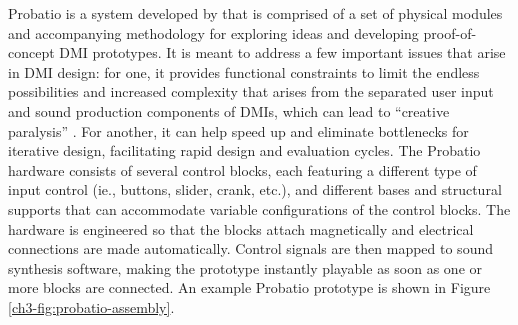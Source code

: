 \documentclass[letterpaper, 12pt]{article}
\begin{document}
Probatio is a system developed by \citet{Calegario2019} that is comprised of a set of physical modules and accompanying methodology for exploring ideas and developing proof-of-concept DMI prototypes. It is meant to address a few important issues that arise in DMI design: for one, it provides functional constraints to limit the endless possibilities and increased complexity that arises from the separated user input and sound production components of DMIs, which can lead to ``creative paralysis'' \citep{Magnusson2010}. For another, it can help speed up and eliminate bottlenecks for iterative design, facilitating rapid design and evaluation cycles. The Probatio hardware consists of several control blocks, each featuring a different type of input control (ie., buttons, slider, crank, etc.), and different bases and structural supports that can accommodate variable configurations of the control blocks. The hardware is engineered so that the blocks attach magnetically and electrical connections are made automatically. Control signals are then mapped to sound synthesis software, making the prototype instantly playable as soon as one or more blocks are connected. An example Probatio prototype is shown in Figure \ref{ch3-fig:probatio-assembly}.
\end{document}
